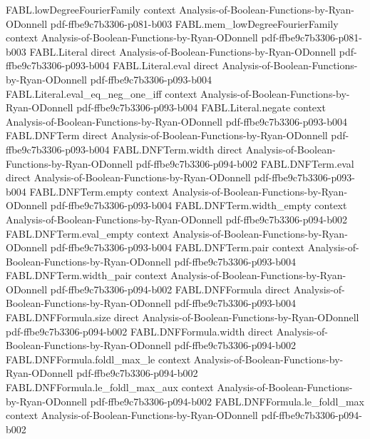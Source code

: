 \begin{theorem}
  {FABL.lowDegreeFourierFamily}
  {context}
  {Analysis-of-Boolean-Functions-by-Ryan-ODonnell}
  {pdf-ffbe9c7b3306-p081-b003}
\proofstep
  {FABL.mem_lowDegreeFourierFamily}
  {context}
  {Analysis-of-Boolean-Functions-by-Ryan-ODonnell}
  {pdf-ffbe9c7b3306-p081-b003}
\proofstep
  {FABL.Literal}
  {direct}
  {Analysis-of-Boolean-Functions-by-Ryan-ODonnell}
  {pdf-ffbe9c7b3306-p093-b004}
\proofstep
  {FABL.Literal.eval}
  {direct}
  {Analysis-of-Boolean-Functions-by-Ryan-ODonnell}
  {pdf-ffbe9c7b3306-p093-b004}
\proofstep
  {FABL.Literal.eval_eq_neg_one_iff}
  {context}
  {Analysis-of-Boolean-Functions-by-Ryan-ODonnell}
  {pdf-ffbe9c7b3306-p093-b004}
\proofstep
  {FABL.Literal.negate}
  {context}
  {Analysis-of-Boolean-Functions-by-Ryan-ODonnell}
  {pdf-ffbe9c7b3306-p093-b004}
\proofstep
  {FABL.DNFTerm}
  {direct}
  {Analysis-of-Boolean-Functions-by-Ryan-ODonnell}
  {pdf-ffbe9c7b3306-p093-b004}
\proofstep
  {FABL.DNFTerm.width}
  {direct}
  {Analysis-of-Boolean-Functions-by-Ryan-ODonnell}
  {pdf-ffbe9c7b3306-p094-b002}
\proofstep
  {FABL.DNFTerm.eval}
  {direct}
  {Analysis-of-Boolean-Functions-by-Ryan-ODonnell}
  {pdf-ffbe9c7b3306-p093-b004}
\proofstep
  {FABL.DNFTerm.empty}
  {context}
  {Analysis-of-Boolean-Functions-by-Ryan-ODonnell}
  {pdf-ffbe9c7b3306-p093-b004}
\proofstep
  {FABL.DNFTerm.width_empty}
  {context}
  {Analysis-of-Boolean-Functions-by-Ryan-ODonnell}
  {pdf-ffbe9c7b3306-p094-b002}
\proofstep
  {FABL.DNFTerm.eval_empty}
  {context}
  {Analysis-of-Boolean-Functions-by-Ryan-ODonnell}
  {pdf-ffbe9c7b3306-p093-b004}
\proofstep
  {FABL.DNFTerm.pair}
  {context}
  {Analysis-of-Boolean-Functions-by-Ryan-ODonnell}
  {pdf-ffbe9c7b3306-p093-b004}
\proofstep
  {FABL.DNFTerm.width_pair}
  {context}
  {Analysis-of-Boolean-Functions-by-Ryan-ODonnell}
  {pdf-ffbe9c7b3306-p094-b002}
\proofstep
  {FABL.DNFFormula}
  {direct}
  {Analysis-of-Boolean-Functions-by-Ryan-ODonnell}
  {pdf-ffbe9c7b3306-p093-b004}
\proofstep
  {FABL.DNFFormula.size}
  {direct}
  {Analysis-of-Boolean-Functions-by-Ryan-ODonnell}
  {pdf-ffbe9c7b3306-p094-b002}
\proofstep
  {FABL.DNFFormula.width}
  {direct}
  {Analysis-of-Boolean-Functions-by-Ryan-ODonnell}
  {pdf-ffbe9c7b3306-p094-b002}
\proofstep
  {FABL.DNFFormula.foldl_max_le}
  {context}
  {Analysis-of-Boolean-Functions-by-Ryan-ODonnell}
  {pdf-ffbe9c7b3306-p094-b002}
\proofstep
  {FABL.DNFFormula.le_foldl_max_aux}
  {context}
  {Analysis-of-Boolean-Functions-by-Ryan-ODonnell}
  {pdf-ffbe9c7b3306-p094-b002}
\proofstep
  {FABL.DNFFormula.le_foldl_max}
  {context}
  {Analysis-of-Boolean-Functions-by-Ryan-ODonnell}
  {pdf-ffbe9c7b3306-p094-b002}

\end{theorem}
